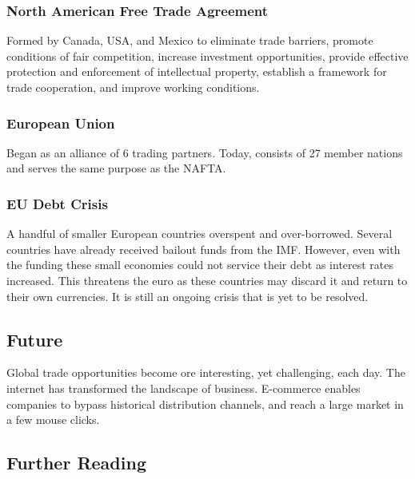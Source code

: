 \documentclass[english, 12pt]{article}
\begin{document}
\subsubsection*{North American Free Trade Agreement}
Formed by Canada, USA, and Mexico to eliminate trade barriers, promote conditions of fair competition, increase investment opportunities, provide effective protection and enforcement of intellectual property, establish a framework for trade cooperation, and improve working conditions.
\subsubsection*{European Union}
Began as an alliance of 6 trading partners. Today, consists of 27 member nations and serves the same purpose as the NAFTA.
\subsubsection*{EU Debt Crisis}
A handful of smaller European countries overspent and over-borrowed. Several countries have already received bailout funds from the IMF. However, even with the funding these small economies could not service their debt as interest rates increased. This threatens the euro as these countries may discard it and return to their own currencies. It is still an ongoing crisis that is yet to be resolved.
\subsection{Future}
Global trade opportunities become ore interesting, yet challenging, each day. The internet has transformed the landscape of business. E-commerce enables companies to bypass historical distribution channels, and reach a large market in a few mouse clicks.
\subsection*{Further Reading}
\end{document}

